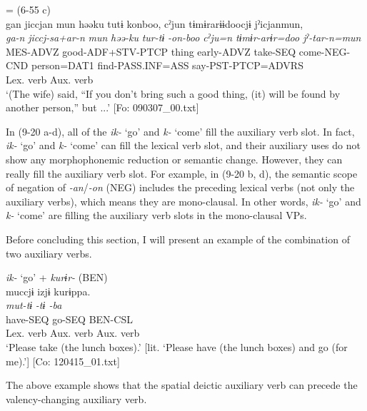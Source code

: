 \ex{} = (6-55 c)\\
    \gllll gan  jiccjan  mun  həəku  tutɨ  konboo,  cˀjun  tɨmɨrarɨɨdoocjɨ  jˀicjanmun,\\
      \textit{ga-n}  \textit{jiccj-sa+ar-n}  \textit{mun}  \textit{həə-ku}  \textit{tur-tɨ} \textit{-on-boo  cˀju=n  tɨmɨr-arɨr=doo  jˀ-tar-n=mun}\\
      MES-ADVZ  good-ADF+STV-PTCP  thing  early-ADVZ  take-SEQ  come-NEG-CND  person=DAT1  find-PASS.INF=ASS  say-PST-PTCP=ADVRS\\
              Lex. verb                                          Aux. verb \\              
      \glt ‘(The wife) said, “If you don’t bring such a good thing, (it) will be found by another person,” but ...’   [Fo: 090307\_00.txt]
    \z
\z

In (9-20 a-d), all of the \textit{ik-} ‘go’ and \textit{k-} ‘come’ fill the auxiliary verb slot. In fact, \textit{ik-} ‘go’ and \textit{k-} ‘come’ can fill the lexical verb slot, and their auxiliary uses do not show any morphophonemic reduction or semantic change. However, they can really fill the auxiliary verb slot. For example, in (9-20 b, d), the semantic scope of negation of \textit{{}-an}/\textit{{}-on} (NEG) includes the preceding lexical verbs (not only the auxiliary verbs), which means they are mono-clausal. In other words, \textit{ik-} ‘go’ and \textit{k-} ‘come’ are filling the auxiliary verb slots in the mono-clausal VPs.

Before concluding this section, I will present an example of the combination of two auxiliary verbs.

\ea   \textit{ik-} ‘go’ + \textit{kurɨr-} (BEN) \label{ex:9.21}\\
 \gllll  muccjɨ  izjɨ  kurɨppa.\\
    \textit{mut-tɨ}  \textit{-tɨ  -ba}\\
    have-SEQ  go-SEQ  BEN-CSL\\
    Lex. verb  Aux. verb  Aux. verb\\
    \glt     ‘Please take (the lunch boxes).’ [lit. ‘Please have (the lunch boxes) and go (for me).’] [Co: 120415\_01.txt]
\z

The above example shows that the spatial deictic auxiliary verb can precede the valency-changing auxiliary verb.


